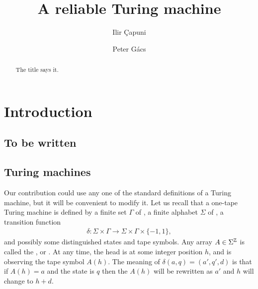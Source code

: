 \documentclass[11pt]{memoir}
\theoremstyle{definition} %
\newcommand{\h}{h}
\begin{document}
\title{A reliable Turing machine}

\author{Ilir \c{C}apuni \and Peter G\'acs}

\maketitle

\begin{abstract}
The title says it.
\end{abstract}

\tableofcontents*

\section{Introduction}

\subsection{To be written}

\subsection{Turing machines}\label{sec:TM}

Our contribution could use any one of the standard definitions of a Turing machine, but it will
be convenient to modify it.
Let us recall that a one-tape Turing machine is defined by a finite set \( \Gamma \) of ,
a finite alphabet \( \Sigma \) of , a transition function
\begin{align*}
             \delta\colon\Sigma\times \Gamma\to \Sigma\times\Gamma\times\{-1,1\},
\end{align*}
and possibly some distinguished states and tape symbols.
Any array \( A\in\Sigma^{\mathbb{Z}} \) is called the , or .
At any time, the head is at some integer position \( \h \), and is observing the tape
symbol \( A(\h) \).
The meaning of \( \delta(a,q)=(a',q',d) \) is that if \( A(\h)=a \) and the state is \( q \) then
the \( A(\h) \) will be rewritten as \( a' \) and \( \h \) will change to \( \h+d \).
\end{document}
